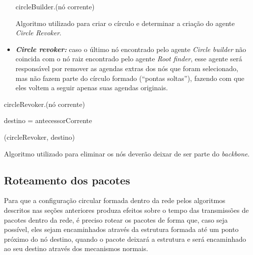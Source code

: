 \begin{itemize}
\begin{algorithm}[H]

	circleBuilder.\configurarAgendasDeBackbone(nó corrente)\;
	
	
\caption{Algoritmo utilizado para criar o círculo e determinar a criação do agente \emph{Circle Revoker}.}
\end{algorithm}
  
 
 \item \textbf{\emph{Circle revoker:}} caso o último nó encontrado pelo agente \emph{Circle builder} não coincida com o nó raiz encontrado pelo agente \emph{Root finder}, esse agente será responsável por remover as agendas extras dos nós que foram selecionado, mas não fazem parte do círculo formado (``pontas soltas''), fazendo com que eles voltem a seguir apenas suas agendas originais.
\end{itemize}

\begin{algorithm}[H]
	

	circleRevoker.\removerAgendasDeBackbone(nó corrente)\;
	
	destino = antecessorCorrente\;
	
	 { 
		\encaminhe(circleRevoker, destino)\;
	}
	
\caption{Algoritmo utilizado para eliminar os nós deverão deixar de ser parte do \emph{backbone}.}
\end{algorithm}

\subsection{Roteamento dos pacotes}

Para que a configuração circular formada dentro da rede pelos algoritmos descritos nas seções anteriores produza efeitos sobre o tempo das transmissões de pacotes dentro da rede, é preciso rotear os pacotes de forma que, caso seja possível, eles sejam encaminhados através da estrutura formada até um ponto próximo do nó destino, quando o pacote deixará a estrutura e será encaminhado ao seu destino através dos mecanismos normais. 

